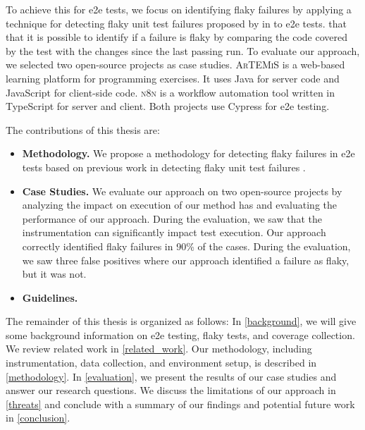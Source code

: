 To achieve this for \ac{e2e} tests, we focus on identifying flaky failures by applying a technique for detecting flaky unit test failures proposed by \citeauthor*{bell_deflaker_2018} in  \autocite{bell_deflaker_2018} to \ac{e2e} tests.
 that that it is possible to identify if a failure is flaky by comparing the code covered by the test with the changes since the last passing run.
To evaluate our approach, we selected two open-source projects as case studies.
\textsc{ArTEMiS} \autocite{krusche_artemis_2018} is a web-based learning platform for programming exercises.
It uses Java for server code and JavaScript for client-side code.
\textsc{n8n} \autocite{noauthor_n8n_2023} is a workflow automation tool written in TypeScript for server and client.
Both projects use Cypress \autocite{noauthor_cypress-iocypress_2023} for \ac{e2e} testing.

The contributions of this thesis are:
\begin{itemize}
	\item \textbf{Methodology.} We propose a methodology for detecting flaky failures in \ac{e2e} tests based on previous work in detecting flaky unit test failures \autocite{bell_deflaker_2018}.
	\item \textbf{Case Studies.} We evaluate our approach on two open-source projects by analyzing the impact on execution of our method has and evaluating the performance of our approach.
	      During the evaluation, we saw that the instrumentation can significantly impact test execution.
	      Our approach correctly identified flaky failures in 90\%  of the cases.
	      During the evaluation, we saw three  false positives where our approach identified a failure as flaky, but it was not.
	\item \textbf{Guidelines.} 
\end{itemize}

The remainder of this thesis is organized as follows:
In \cref{background}, we will give some background information on \ac{e2e} testing, flaky tests, and coverage collection.
We review related work in \cref{related_work}.
Our methodology, including instrumentation, data collection, and environment setup, is described in \cref{methodology}.
In \cref{evaluation}, we present the results of our case studies and answer our research questions.
We discuss the limitations of our approach in \cref{threats} and conclude with a summary of our findings and potential future work in \cref{conclusion}.



